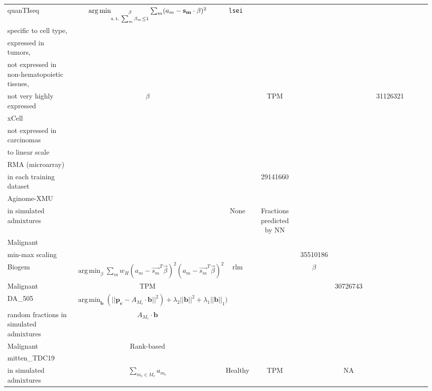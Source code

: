 \documentclass[border=3mm,preview]{standalone}
\DeclareMathOperator*{\argmin}{arg\,min}
\newcommand{\mybf}{\fontseries{b}\selectfont} %
\begin{document}
\begin{threeparttable}
\begin{tabular}{lcccccccccc}
    \mybf quanTIseq &
    $
    \argmin_{
      \substack{
        \mathbf{\beta} \\
        \text{s.\,t.}\, \sum_m \beta_m \le 1
      }
    } \sum_m (a_m - \mathbf{s_m} \cdot \mathbf{\beta})^2 $
    & \tt{lsei} & \makecell{Correlated with random fractions in simulated admixtures,\\specific to cell type,\\expressed in tumors,\\not expressed in non-hematopoietic tissues,\\not very highly expressed} & $\beta$ & & TPM & & & & 31126321 \\
    \mybf xCell & & & \makecell{DE’ed, specific to cell type,\\not expressed in carcinomas}& \makecell{ssGSEA mapped\\to linear scale} & & \makecell{FPKM (RNA-seq),\\RMA (microarray)} & \makecell{Markers determined independently\\in each training dataset} & & & 29141660 \\
\hline    
    \mybf Aginome-XMU & \makecell{DNN trained to predict random fractions\\in simulated admixtures} & & None & Fractions predicted by NN & \makecell{Healthy,\\Malignant} & \makecell{TPM,log,\\min-max scaling}& & & & 35510186 \\
    \mybf Biogem & $\argmin_\beta \sum_m w_H(a_m - \vec{s_m}^T \vec{\beta})^2 (a_m - \vec{s_m}^T \vec{\beta})^2$ & rlm & & $\beta$ & \makecell{Healthy,\\Malignant}& TPM & & & & 30726743 \\
    \mybf DA\_505 & $\argmin_\mathbf{b} (||\mathbf{p_c} - A_{M_c} \cdot \mathbf{b}||^2) + \lambda_2||\mathbf{b}||^2 + \lambda_1 ||\mathbf{b}||_1) $ & & \makecell{Identified by RF regression against\\random fractions in simulated admixtures} & $A_{M_c} \cdot \mathbf{b}$ & \makecell{Healthy,\\Malignant} & Rank-based & & & & \\
    \mybf mitten\_TDC19 & & & \makecell{Correlated with random fractions\\in simulated admixtures} & $\sum_{m_c \in M_c} a_{m_c}$ & Healthy & TPM & & NA & & \\             
    \midrule
\end{tabular}
\caption*{$|e|_\epsilon \equiv 0 \text{if } |e| < \epsilon; |e| - \epsilon \text{otherwise}$ \\
$w_H(e) \equiv 1 \text{if } |e| < k;  k/|e| \text{otherwise}$}

\end{threeparttable}
\end{document}

